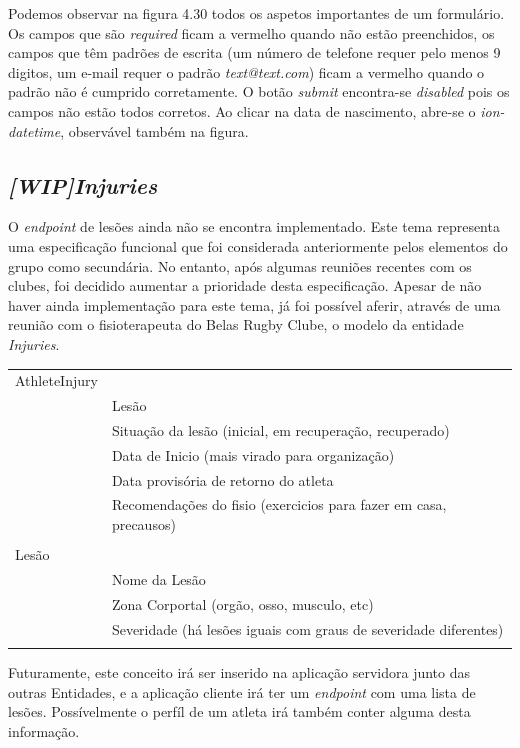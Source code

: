 Podemos observar na figura 4.30 todos os aspetos importantes de um formulário. Os campos que são \textit{required} ficam a vermelho quando não estão preenchidos, os campos que têm padrões de escrita (um número de telefone requer pelo menos 9 digitos, um e-mail requer o padrão \textit{text@text.com}) ficam a vermelho quando o padrão não é cumprido corretamente. O botão \textit{submit} encontra-se \textit{disabled} pois os campos não estão todos corretos. Ao clicar na data de nascimento, abre-se o \textit{ion-datetime}, observável também na figura.


\subsection{\textit{[WIP]Injuries}}\label{subsec428}
O \textit{endpoint} de lesões ainda não se encontra implementado. Este tema representa uma especificação funcional que foi considerada anteriormente pelos elementos do grupo como secundária. No entanto, após algumas reuniões recentes com os clubes, foi decidido aumentar a prioridade desta especificação. Apesar de não haver ainda implementação para este tema, já foi possível aferir, através de uma reunião com o fisioterapeuta do Belas Rugby Clube, o modelo da entidade \textit{Injuries}.

\begin{tabular}{ll}
	AthleteInjury&\\
	&Lesão\\
	&Situação da lesão (inicial, em recuperação, recuperado)\\
	&Data de Inicio (mais virado para organização)\\
	&Data provisória de retorno do atleta\\
	&Recomendações do fisio (exercicios para fazer em casa, precausos)\\
	&\\
	Lesão&\\
	&Nome da Lesão\\
	&Zona Corportal (orgão, osso, musculo, etc)\\
	&Severidade (há lesões iguais com graus de severidade diferentes)\\
	&\\
\end{tabular}


Futuramente, este conceito irá ser inserido na aplicação servidora junto das outras Entidades, e a aplicação cliente irá ter um \textit{endpoint} com uma lista de lesões. Possívelmente o perfíl de um atleta irá também conter alguma desta informação.
